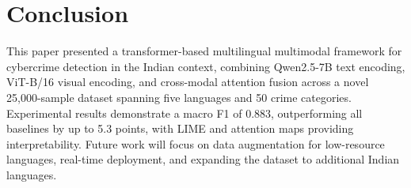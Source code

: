 



\section{Conclusion}
This paper presented a transformer-based multilingual 
multimodal framework for cybercrime detection in the 
Indian context, combining Qwen2.5-7B text encoding, 
ViT-B/16 visual encoding, and cross-modal attention 
fusion across a novel 25,000-sample dataset spanning 
five languages and 50 crime categories. Experimental 
results demonstrate a macro F1 of 0.883, outperforming
all baselines by up to 5.3 points, with LIME and
attention maps providing interpretability. Future work
will focus on data
augmentation for low-resource languages, real-time 
deployment, and expanding the dataset to additional 
Indian languages.
